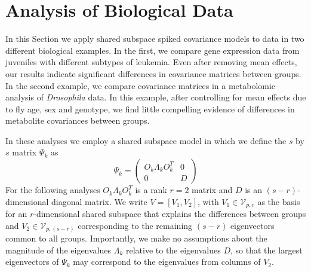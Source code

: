 \documentclass{statsoc}
\newcommand{\tr}{\text{tr}}
\begin{document}





\section{Analysis of Biological Data}
\label{sec:app}

In this Section we apply shared subspace spiked covariance models to data in two
different biological examples.  In the first, we compare gene
expression data from juveniles with different subtypes of leukemia.  Even
after removing mean effects, our results indicate significant differences
in covariance matrices between groups.  In the second example, we
compare covariance matrices in a metabolomic analysis of \textit{Drosophila} data.  In
this example, after controlling for mean effects due to fly age, sex and
genotype, we find little compelling evidence of differences in metabolite
covariances between groups. 

In these analyses we employ a shared subspace model in
which we define the $s$ by $s$ matrix $\Psi_k$ as
%
\begin{equation}
\Psi_k =\left( \begin{array}{cc}
O_k\Lambda_kO_k^T & 0  \\
0 & D  \end{array} \right)
\end{equation}
%
For the following analyses $O_k\Lambda_kO_k^T$ is a rank $r=2$ matrix
and $D$ is an $(s-r)$-dimensional diagonal matrix.  We write
$V = [V_1, V_2]$, with $V_1 \in \mathcal{V}_{p,r}$ as the basis for an
$r$-dimensional shared subspace that explains the differences between
groups and $V_2 \in \mathcal{V}_{p,(s-r)}$ corresponding to the remaining $(s-r)$
eigenvectors common to all groups.  Importantly, we make no assumptions about the
magnitude of the eigenvalues $\Lambda_k$ relative to the eigenvalues
$D$, so that the largest eigenvectors of $\Psi_k$ may correspond to
the eigenvalues from columns of $V_2$.  
\end{document}
